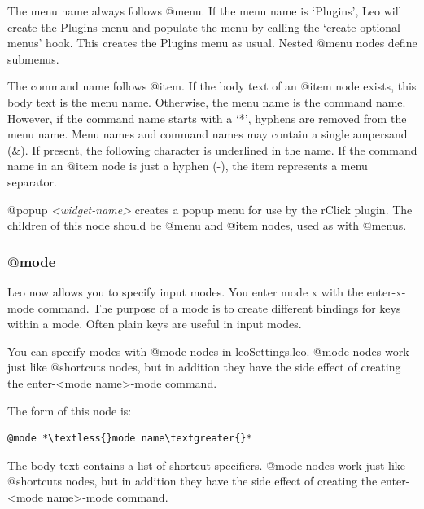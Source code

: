 \documentclass[a4paper,10pt,english]{sphinxmanual}
\begin{document}
The menu name always follows @menu. If the menu name is `Plugins', Leo will
create the Plugins menu and populate the menu by calling the
`create-optional-menus' hook. This creates the Plugins menu as usual. Nested
@menu nodes define submenus.

The command name follows @item. If the body text of an @item node exists, this
body text is the menu name. Otherwise, the menu name is the command name.
However, if the command name starts with a `*', hyphens are removed from the
menu name. Menu names and command names may contain a single ampersand (\&). If
present, the following character is underlined in the name. If the command
name in an @item node is just a hyphen (-), the item represents a menu
separator.

@popup \emph{\textless{}widget-name\textgreater{}} creates a popup menu for use by the rClick plugin.
The children of this node should be @menu and @item nodes, used as with
@menus.


\subsubsection{@mode}
\label{customizing:mode}
Leo now allows you to specify input modes. You enter mode x with the
enter-x-mode command. The purpose of a mode is to create different bindings
for keys within a mode. Often plain keys are useful in input modes.

You can specify modes with @mode nodes in leoSettings.leo. @mode nodes work
just like @shortcuts nodes, but in addition they have the side effect of
creating the enter-\textless{}mode name\textgreater{}-mode command.

The form of this node is:

\begin{Verbatim}[commandchars=\\\{\}]
@mode *\textless{}mode name\textgreater{}*
\end{Verbatim}

The body text contains a list of shortcut specifiers. @mode nodes work just
like @shortcuts nodes, but in addition they have the side effect of creating
the enter-\textless{}mode name\textgreater{}-mode command.
\end{document}
